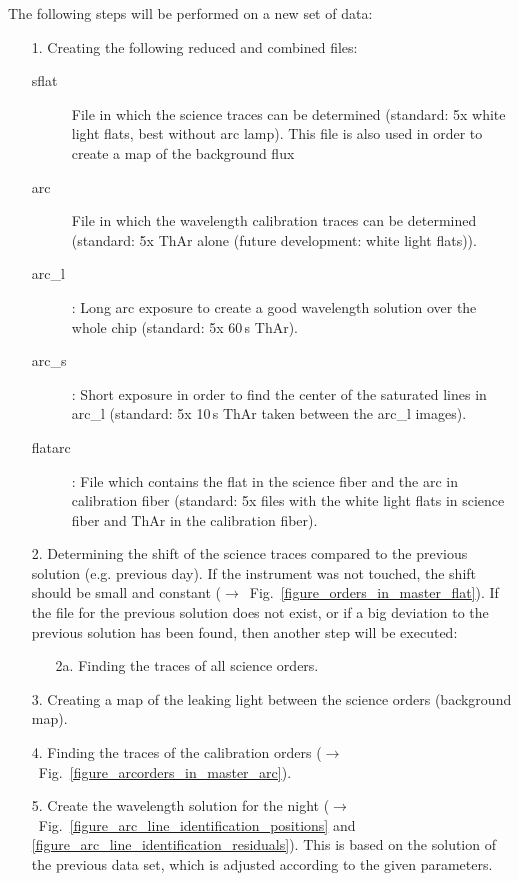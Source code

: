 \documentclass[10pt,a4paper]{article}
\begin{document}
\noindent The following steps will be performed on a new set of data:
\begin{itemize}
  \item[1.] Creating the following reduced and combined files:
  \begin{description}
    \item[sflat] File in which the science traces can be determined (standard: 5x white light flats, best without arc lamp). This file is also used in order to create a map of the background flux
    \item[arc] File in which the wavelength calibration traces can be determined (standard: 5x ThAr alone (future development: white light flats)).
    \item[arc\_l]: Long arc exposure to create a good wavelength solution over the whole chip (standard: 5x 60\,s ThAr).
    \item[arc\_s]: Short exposure in order to find the center of the saturated lines in arc\_l (standard: 5x 10\,s ThAr taken between the arc\_l images).
    \item[flatarc]: File which contains the flat in the science fiber and the arc in calibration fiber (standard: 5x files with the white light flats in science fiber and ThAr in the calibration fiber).
  \end{description}
  \item[2.] Determining the shift of the science traces compared to the previous solution (e.g. previous day). If the instrument was not touched, the shift should be small and constant ($\rightarrow$~Fig.~\ref{figure_orders_in_master_flat}). If the file for the previous solution does not exist, or if a big deviation to the previous solution has been found, then another step will be executed:
  \begin{itemize}
    \item[2a.] Finding the traces of all science orders.
  \end{itemize}
  \item[3.] Creating a map of the leaking light between the science orders (background map).
  \item[4.] Finding the traces of the calibration orders ($\rightarrow$~Fig.~\ref{figure_arcorders_in_master_arc}).
  \item[5.] Create the wavelength solution for the night ($\rightarrow$~Fig.~\ref{figure_arc_line_identification_positions} and \ref{figure_arc_line_identification_residuals}). This is based on the solution of the previous data set, which is adjusted according to the given parameters.

\end{itemize}
\end{document}
